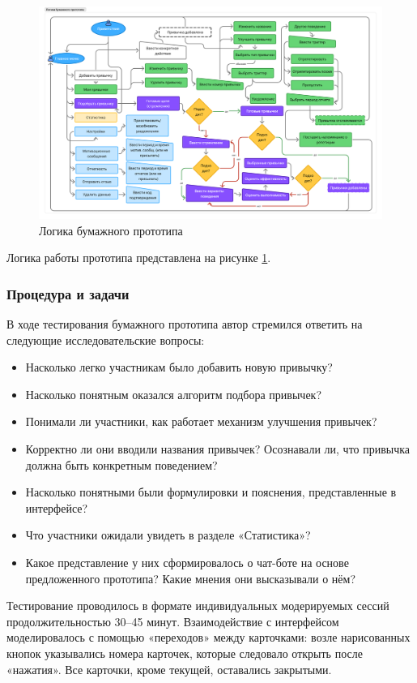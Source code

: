 \documentclass[pdflatex,sn-mathphys-num]{sn-jnl}%
\theoremstyle{thmstyleone}%
\theoremstyle{thmstyletwo}%
\theoremstyle{thmstylethree}%
\begin{document}
\begin{figure}[]
\centering
\includegraphics[width=1.1\textwidth]{figures/paper_prototype_logic.png}
\caption{Логика бумажного прототипа}
\label{fig:paper_bot_logic}
\end{figure}

Логика работы прототипа представлена на рисунке \ref{fig:paper_bot_logic}. 

\subsubsection{Процедура и задачи}

В ходе тестирования бумажного прототипа автор стремился ответить на следующие исследовательские вопросы:

\begin{itemize}
\item Насколько легко участникам было добавить новую привычку?
\item Насколько понятным оказался алгоритм подбора привычек?
\item Понимали ли участники, как работает механизм улучшения привычек?
\item Корректно ли они вводили названия привычек? Осознавали ли, что привычка должна быть конкретным поведением?
\item Насколько понятными были формулировки и пояснения, представленные в интерфейсе?
\item Что участники ожидали увидеть в разделе «Статистика»?
\item Какое представление у них сформировалось о чат-боте на основе предложенного прототипа? Какие мнения они высказывали о нём?
\end{itemize}

Тестирование проводилось в формате индивидуальных модерируемых сессий продолжительностью 30–45 минут. Взаимодействие с интерфейсом моделировалось с помощью «переходов» между карточками: возле нарисованных кнопок указывались номера карточек, которые следовало открыть после «нажатия». Все карточки, кроме текущей, оставались закрытыми.
\end{document}
